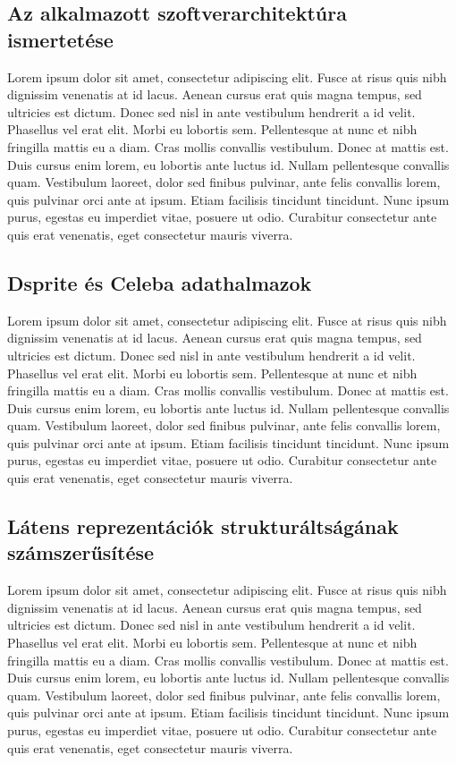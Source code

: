 \documentclass[12pt]{article}
\begin{document}
\subsection{Az alkalmazott szoftverarchitektúra ismertetése}

Lorem ipsum dolor sit amet, consectetur adipiscing elit. Fusce at risus quis nibh dignissim venenatis at id lacus. Aenean cursus erat quis magna tempus, sed ultricies est dictum. Donec sed nisl in ante vestibulum hendrerit a id velit. Phasellus vel erat elit. Morbi eu lobortis sem. Pellentesque at nunc et nibh fringilla mattis eu a diam. Cras mollis convallis vestibulum. Donec at mattis est. Duis cursus enim lorem, eu lobortis ante luctus id. Nullam pellentesque convallis quam. Vestibulum laoreet, dolor sed finibus pulvinar, ante felis convallis lorem, quis pulvinar orci ante at ipsum. Etiam facilisis tincidunt tincidunt. Nunc ipsum purus, egestas eu imperdiet vitae, posuere ut odio. Curabitur consectetur ante quis erat venenatis, eget consectetur mauris viverra.

\subsection{Dsprite és Celeba adathalmazok}

Lorem ipsum dolor sit amet, consectetur adipiscing elit. Fusce at risus quis nibh dignissim venenatis at id lacus. Aenean cursus erat quis magna tempus, sed ultricies est dictum. Donec sed nisl in ante vestibulum hendrerit a id velit. Phasellus vel erat elit. Morbi eu lobortis sem. Pellentesque at nunc et nibh fringilla mattis eu a diam. Cras mollis convallis vestibulum. Donec at mattis est. Duis cursus enim lorem, eu lobortis ante luctus id. Nullam pellentesque convallis quam. Vestibulum laoreet, dolor sed finibus pulvinar, ante felis convallis lorem, quis pulvinar orci ante at ipsum. Etiam facilisis tincidunt tincidunt. Nunc ipsum purus, egestas eu imperdiet vitae, posuere ut odio. Curabitur consectetur ante quis erat venenatis, eget consectetur mauris viverra.

\subsection{Látens reprezentációk strukturáltságának számszerűsítése}

Lorem ipsum dolor sit amet, consectetur adipiscing elit. Fusce at risus quis nibh dignissim venenatis at id lacus. Aenean cursus erat quis magna tempus, sed ultricies est dictum. Donec sed nisl in ante vestibulum hendrerit a id velit. Phasellus vel erat elit. Morbi eu lobortis sem. Pellentesque at nunc et nibh fringilla mattis eu a diam. Cras mollis convallis vestibulum. Donec at mattis est. Duis cursus enim lorem, eu lobortis ante luctus id. Nullam pellentesque convallis quam. Vestibulum laoreet, dolor sed finibus pulvinar, ante felis convallis lorem, quis pulvinar orci ante at ipsum. Etiam facilisis tincidunt tincidunt. Nunc ipsum purus, egestas eu imperdiet vitae, posuere ut odio. Curabitur consectetur ante quis erat venenatis, eget consectetur mauris viverra.
\end{document}
